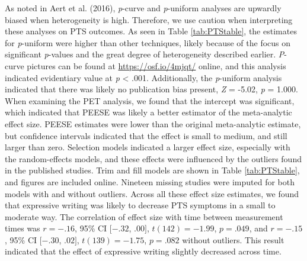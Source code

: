 \documentclass[english,man, mask]{apa6}
\theoremstyle{definition}
\theoremstyle{definition}
\theoremstyle{definition}
\theoremstyle{remark}
\begin{document}
As noted in Aert et al. (2016), \emph{p}-curve and \emph{p}-uniform
analyses are upwardly biased when heterogeneity is high. Therefore, we
use caution when interpreting these analyses on PTS outcomes. As seen in
Table \ref{tab:PTStable}, the estimates for \emph{p}-uniform were higher
than other techniques, likely because of the focus on significant
\emph{p}-values and the great degree of heterogeneity described earlier.
\emph{P}-curve pictures can be found at \url{https://osf.io/4mjqt/}
online, and this analysis indicated evidentiary value at \emph{p}
\textless{} .001. Additionally, the \emph{p}-uniform analysis indicated
that there was likely no publication bias present, \emph{Z} = -5.02,
\emph{p} = 1.000. When examining the PET analysis, we found that the
intercept was significant, which indicated that PEESE was likely a
better estimator of the meta-analytic effect size. PEESE estimates were
lower than the original meta-analytic estimate, but confidence intervals
indicated that the effect is small to medium, and still larger than
zero. Selection models indicated a larger effect size, especially with
the random-effects models, and these effects were influenced by the
outliers found in the published studies. Trim and fill models are shown
in Table \ref{tab:PTStable}, and figures are included online. Nineteen
missing studies were imputed for both models with and without outliers.
Across all these effect size estimates, we found that expressive writing
was likely to decrease PTS symptoms in a small to moderate way. The
correlation of effect size with time between measurement times was
\(r = -.16\), 95\% CI \([-.32\), \(.00]\), \(t(142) = -1.99\),
\(p = .049\), and \(r = -.15\), 95\% CI \([-.30\), \(.02]\),
\(t(139) = -1.75\), \(p = .082\) without outliers. This result indicated
that the effect of expressive writing slightly decreased across time.
\end{document}
